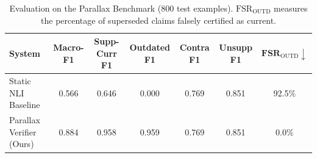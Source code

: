 \begin{table}[t]
\centering
\small
\begin{tabular}{l|c|cccc|c}
\toprule
\textbf{System} & \textbf{Macro-F1} & \textbf{Supp-Curr F1} & \textbf{Outdated F1} & \textbf{Contra F1} & \textbf{Unsupp F1} & $\mathbf{FSR}_{\text{OUTD}} \downarrow$ \\
\midrule
Static NLI Baseline & 0.566 & 0.646 & 0.000 & 0.769 & 0.851 & 92.5\% \\
Parallax Verifier (Ours) & 0.884 & 0.958 & 0.959 & 0.769 & 0.851 & 0.0\% \\
\bottomrule
\end{tabular}
\caption{Evaluation on the Parallax Benchmark (800 test examples). $\text{FSR}_{\text{OUTD}}$ measures the percentage of superseded claims falsely certified as current.}
\label{tab:main_results}
\end{table}
